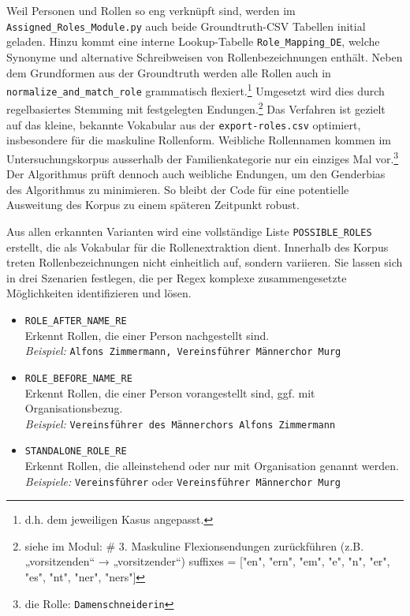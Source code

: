 \documentclass[12pt, a4paper, ngerman, bidi=default]{article}
\newcommand{\code}[1]{\colorbox{VeryLightGray}{\texttt{#1}}} %
\begin{document}
Weil Personen und Rollen so eng verknüpft sind, werden im \code{Assigned\_Roles\_Module.py} auch beide Groundtruth-CSV Tabellen initial geladen. Hinzu kommt eine interne Lookup-Tabelle \code{Role\_Mapping\_DE}, welche Synonyme und alternative Schreibweisen von Rollenbezeichnungen enthält. Neben dem Grundformen aus der Groundtruth werden alle Rollen auch in \code{normalize\_and\_match\_role} grammatisch flexiert.\footnote{d.h. dem jeweiligen Kasus angepasst.} Umgesetzt wird dies durch regelbasiertes Stemming mit festgelegten Endungen.\footnote{siehe im Modul: # 3. Maskuline Flexionsendungen zurückführen (z.B. „vorsitzenden“ → „vorsitzender“)
    suffixes = ["en", "ern", "em", "e", "n", "er", "es", "nt", "ner", "ners"]}
Das Verfahren ist gezielt auf das kleine, bekannte Vokabular aus der \code{export-roles.csv} optimiert, insbesondere für die maskuline Rollenform. Weibliche Rollennamen kommen im Untersuchungskorpus ausserhalb der Familienkategorie nur ein einziges Mal vor.\footnote{die Rolle: \texttt{Damenschneiderin}} Der Algorithmus prüft dennoch auch weibliche Endungen, um den Genderbias des Algorithmus zu minimieren. So bleibt der Code für eine potentielle Ausweitung des Korpus zu einem späteren Zeitpunkt robust.

Aus allen erkannten Varianten wird eine vollständige Liste \code{POSSIBLE\_ROLES} erstellt, die als Vokabular für die Rollenextraktion dient. Innerhalb des Korpus treten Rollenbezeichnungen nicht einheitlich auf, sondern variieren. Sie lassen sich in drei Szenarien festlegen, die per Regex komplexe zusammengesetzte Möglichkeiten identifizieren und lösen.

\begin{itemize}
    \item \code{ROLE\_AFTER\_NAME\_RE} \\
    Erkennt Rollen, die einer Person nachgestellt sind. \\
    \textit{Beispiel:} \texttt{Alfons Zimmermann, Vereinsführer Männerchor Murg}
    
    \item \code{ROLE\_BEFORE\_NAME\_RE} \\
    Erkennt Rollen, die einer Person vorangestellt sind, ggf. mit Organisationsbezug. \\
    \textit{Beispiel:} \texttt{Vereinsführer des Männerchors Alfons Zimmermann}
    
    \item \code{STANDALONE\_ROLE\_RE} \\
    Erkennt Rollen, die alleinstehend oder nur mit Organisation genannt werden. \\
    \textit{Beispiele:} \texttt{Vereinsführer} oder \texttt{Vereinsführer Männerchor Murg}
\end{itemize}
\end{document}

